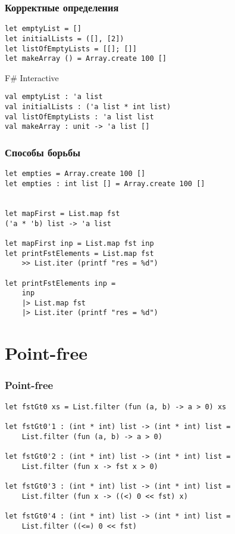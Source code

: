 \documentclass[xetex,mathserif,serif]{beamer}
\begin{document}
	\begin{frame}[fragile]
		\frametitle{Корректные определения}
		\begin{verbatim}
let emptyList = []
let initialLists = ([], [2])
let listOfEmptyLists = [[]; []]
let makeArray () = Array.create 100 []
		\end{verbatim}
		
		\begin{alertblock}{F\# Interactive}
			\begin{verbatim}
val emptyList : 'a list
val initialLists : ('a list * int list)
val listOfEmptyLists : 'a list list
val makeArray : unit -> 'a list []
			\end{verbatim}
		\end{alertblock}
\end{frame}

	\begin{frame}[fragile]
		\frametitle{Способы борьбы}
		\begin{verbatim}
let empties = Array.create 100 []
let empties : int list [] = Array.create 100 []


let mapFirst = List.map fst
('a * 'b) list -> 'a list

let mapFirst inp = List.map fst inp
let printFstElements = List.map fst
    >> List.iter (printf "res = %d")

let printFstElements inp = 
    inp
    |> List.map fst
    |> List.iter (printf "res = %d")
		\end{verbatim}
\end{frame}

	\section{Point-free}
	
	\begin{frame}[fragile]
		\frametitle{Point-free}
		\begin{verbatim}
let fstGt0 xs = List.filter (fun (a, b) -> a > 0) xs

let fstGt0'1 : (int * int) list -> (int * int) list = 
    List.filter (fun (a, b) -> a > 0)

let fstGt0'2 : (int * int) list -> (int * int) list = 
    List.filter (fun x -> fst x > 0)

let fstGt0'3 : (int * int) list -> (int * int) list = 
    List.filter (fun x -> ((<) 0 << fst) x)

let fstGt0'4 : (int * int) list -> (int * int) list = 
    List.filter ((<=) 0 << fst)
		\end{verbatim}
\end{frame}
\end{document}

